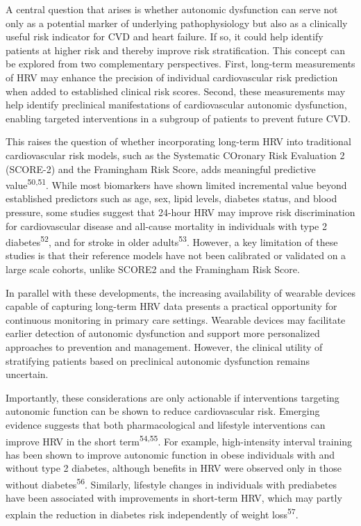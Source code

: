 \documentclass[
  a4paper,
  headsepline=true,
  open=any]{scrbook}
\begin{document}
A central question that arises is whether autonomic dysfunction can
serve not only as a potential marker of underlying pathophysiology but
also as a clinically useful risk indicator for CVD and heart failure. If
so, it could help identify patients at higher risk and thereby improve
risk stratification. This concept can be explored from two complementary
perspectives. First, long-term measurements of HRV may enhance the
precision of individual cardiovascular risk prediction when added to
established clinical risk scores. Second, these measurements may help
identify preclinical manifestations of cardiovascular autonomic
dysfunction, enabling targeted interventions in a subgroup of patients
to prevent future CVD.

This raises the question of whether incorporating long-term HRV into
traditional cardiovascular risk models, such as the Systematic COronary
Risk Evaluation 2 (SCORE-2) and the Framingham Risk Score, adds
meaningful predictive value\textsuperscript{50,51}. While most
biomarkers have shown limited incremental value beyond established
predictors such as age, sex, lipid levels, diabetes status, and blood
pressure, some studies suggest that 24-hour HRV may improve risk
discrimination for cardiovascular disease and all-cause mortality in
individuals with type 2 diabetes\textsuperscript{52}, and for stroke in
older adults\textsuperscript{53}. However, a key limitation of these
studies is that their reference models have not been calibrated or
validated on a large scale cohorts, unlike SCORE2 and the Framingham
Risk Score.

In parallel with these developments, the increasing availability of
wearable devices capable of capturing long-term HRV data presents a
practical opportunity for continuous monitoring in primary care
settings. Wearable devices may facilitate earlier detection of autonomic
dysfunction and support more personalized approaches to prevention and
management. However, the clinical utility of stratifying patients based
on preclinical autonomic dysfunction remains uncertain.

Importantly, these considerations are only actionable if interventions
targeting autonomic function can be shown to reduce cardiovascular risk.
Emerging evidence suggests that both pharmacological and lifestyle
interventions can improve HRV in the short term\textsuperscript{54,55}.
For example, high-intensity interval training has been shown to improve
autonomic function in obese individuals with and without type 2
diabetes, although benefits in HRV were observed only in those without
diabetes\textsuperscript{56}. Similarly, lifestyle changes in
individuals with prediabetes have been associated with improvements in
short-term HRV, which may partly explain the reduction in diabetes risk
independently of weight loss\textsuperscript{57}.
\end{document}

